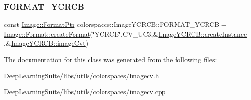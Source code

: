 \subsubsection{\texorpdfstring{F\+O\+R\+M\+A\+T\+\_\+\+Y\+C\+R\+CB}{FORMAT\_YCRCB}}
{\footnotesize\ttfamily const \hyperlink{classcolorspaces_1_1_image_ab3978cc7acc2b5e855f8c715f09667d1}{Image\+::\+Format\+Ptr} colorspaces\+::\+Image\+Y\+C\+R\+C\+B\+::\+F\+O\+R\+M\+A\+T\+\_\+\+Y\+C\+R\+CB = \hyperlink{classcolorspaces_1_1_image_1_1_format_ae79208f237b72cf596331ebcec2ff58b}{Image\+::\+Format\+::create\+Format}(\char`\"{}Y\+C\+R\+CB\char`\"{},C\+V\+\_\+U\+C3,\&\hyperlink{classcolorspaces_1_1_image_y_c_r_c_b_ad2774884c1acea49b7c6799839763a02}{Image\+Y\+C\+R\+C\+B\+::create\+Instance},\&\hyperlink{classcolorspaces_1_1_image_y_c_r_c_b_aae06774e3c6de95fdd0fc20d87eb1400}{Image\+Y\+C\+R\+C\+B\+::image\+Cvt})\hspace{0.3cm}{\ttfamily [static]}}



The documentation for this class was generated from the following files\+:\begin{DoxyCompactItemize}
\item 
Deep\+Learning\+Suite/libs/utils/colorspaces/\hyperlink{imagecv_8h}{imagecv.\+h}\item 
Deep\+Learning\+Suite/libs/utils/colorspaces/\hyperlink{imagecv_8cpp}{imagecv.\+cpp}\end{DoxyCompactItemize}
